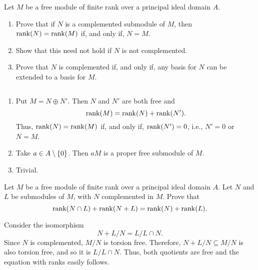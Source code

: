 \begin{exr}
    Let\/ $M$ be a free module of finite rank over a principal ideal domain\/ $A$.  
    \begin{enumerate}[\rm a)]
        \item Prove that if\/ $N$ is a complemented submodule of\/ $M$, then\/ $\operatorname{rank}(N) = \operatorname{rank}(M)$ if, and only if, $N=M$.
        \item Show that this need not hold if\/ $N$ is not complemented.
        \item Prove that\/ $N$ is complemented if, and only if, any basis for\/ $N$ can be extended to a basis for\/ $M$.
    \end{enumerate}
\end{exr}

\begin{solution}${}$
    \begin{enumerate}[\rm a)]
        \item Put $M=N\oplus N'$. Then $N$ and $N'$ are both free and
        $$
            \operatorname{rank}(M)=\operatorname{rank}(N)+\operatorname{rank}(N').
        $$
        Thus, $\operatorname{rank}(N)=\operatorname{rank}(M)$ if, and only if, $\operatorname{rank}(N')=0$, i.e., $N'=0$ or $N=M$.

        \item Take $a\in A\setminus\{0\}$. Then $aM$ is a proper free submodule of $M$.

        \item Trivial.
    \end{enumerate}    
\end{solution}


\begin{exr}
    Let\/ $M$ be a free module of finite rank over a principal ideal domain\/ $A$. Let\/ $N$ and\/ $L$ be submodules of\/ $M$, with\/ $N$ complemented in\/ $M$. Prove that  
    $$
        \operatorname{rank}(N \cap L) + \operatorname{rank}(N + L) = \operatorname{rank}(N) + \operatorname{rank}(L).
    $$
\end{exr}

\begin{solution} Consider the isomorphism
    $$
        N+L/N = L/L\cap N.
    $$
    Since $N$ is complemented, $M/N$ is torsion free. Therefore, $N+L/N\subseteq M/N$ is also torsion free, and so it is $L/L\cap N$. Thus, both quotients are free and the equation with ranks easily follows.
\end{solution}

